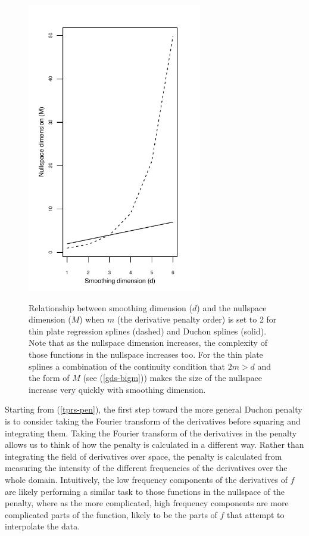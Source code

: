 \documentclass[useAMS,referee]{biom}
\begin{document}
\begin{figure}
\centering
\includegraphics[width=3in]{figs/nullspace-dim.pdf} \\
\caption{Relationship between smoothing dimension ($d$) and the nullspace dimension ($M$) when $m$ (the derivative penalty order) is set to 2 for thin plate regression splines (dashed) and Duchon splines (solid). Note that as the nullspace dimension increases, the complexity of those functions in the nullspace increases too. For the thin plate splines a combination of the continuity condition that $2m>d$ and the form of $M$ (see (\ref{gds-bigm})) makes the size of the nullspace increase very quickly with smoothing dimension.}
\label{nullspace-dim}
\end{figure}

Starting from (\ref{tprs-pen}), the first step toward the more general Duchon penalty is to consider taking the Fourier transform of the derivatives before squaring and integrating them. Taking the Fourier transform of the derivatives in the penalty allows us to think of how the penalty is calculated in a different way. Rather than integrating the field of derivatives over space, the penalty is calculated from measuring the intensity of the different frequencies of the derivatives over the whole domain. Intuitively, the low frequency components of the derivatives of $f$ are likely performing a similar task to those functions in the nullspace of the penalty, where as the more complicated, high frequency components are more complicated parts of the function, likely to be the parts of $f$ that attempt to interpolate the data.
\end{document}
